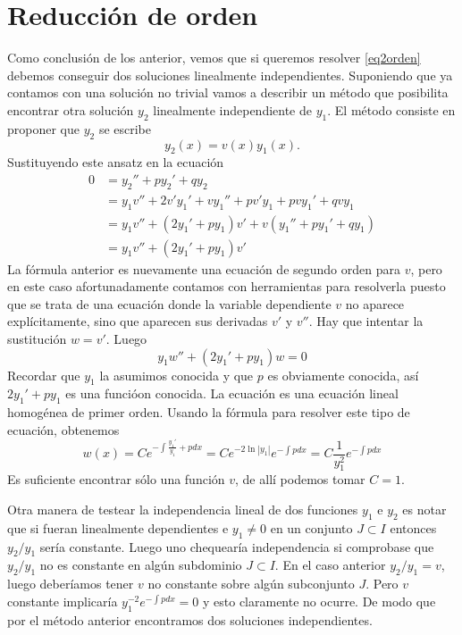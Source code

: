 \section{Reducción de orden}

Como conclusión de los anterior, vemos que si queremos resolver \eqref{eq2orden} debemos conseguir dos soluciones linealmente independientes.
Suponiendo que ya contamos con una solución no trivial vamos a describir un método
que posibilita encontrar otra solución $y_2$ linealmente independiente de $y_1$.
El método consiste en proponer que $y_2$ se escribe
\[\boxed{y_2(x)=v(x)y_1(x)}.\]
Sustituyendo este ansatz en la ecuación
\[
\begin{split}
0&=y_2''+py_2'+qy_2\\
&=y_1v''+2v'y_1'+vy_1''+pv'y_1+pvy_1'+qvy_1\\
&=y_1 v''+(2y_1'+py_1)v'+v(y_1''+py_1'+qy_1)\\
&=y_1 v''+(2y_1'+py_1)v'
\end{split}
\]
La fórmula anterior es nuevamente una ecuación de segundo orden para $v$,
pero en este caso afortunadamente contamos con herramientas para resolverla puesto que se trata de una ecuación donde la
variable dependiente $v$ no aparece explícitamente, sino que aparecen sus derivadas $v'$ y $v''$. Hay que intentar la sustitución $w=v'$.
Luego
\[
y_1w''+(2y_1'+py_1)w=0
\]
Recordar que $y_1$ la asumimos conocida y que $p$ es obviamente conocida, así $2y_1'+py_1$ es una funcióon conocida. La ecuación es una ecuación lineal homogénea de primer orden.
Usando la fórmula para resolver este tipo de ecuación, obtenemos
\[w(x)=Ce^{-\int \frac{y_1'}{y_1}+p dx}=Ce^{-2\ln|y_1|}e^{-\int p dx}=C\frac{1}{y_1^2}e^{-\int p dx} \]
Es suficiente encontrar sólo una función $v$, de allí podemos tomar $C=1$.


Otra manera de testear la independencia lineal de dos funciones $y_1$ e $y_2$ es notar que si fueran linealmente dependientes e $y_1\neq 0$
en un conjunto $J\subset I$ entonces $y_2/y_1$
sería constante.
Luego uno chequearía independencia si comprobase que $y_2/y_1$ no es constante en algún subdominio $J\subset I$.
En el caso anterior $y_2/y_1=v$, luego
deberíamos tener $v$ no constante sobre algún subconjunto $J$. Pero $v$ constante implicaría $y_1^{-2}e^{-\int pdx}=0$ y esto claramente no ocurre. De modo que por el
método anterior encontramos dos soluciones independientes.

